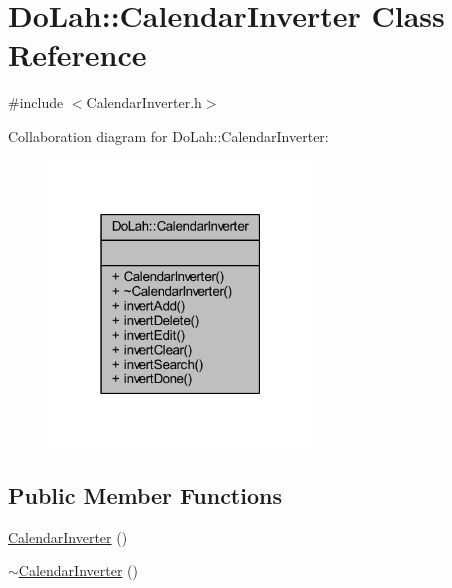 \hypertarget{class_do_lah_1_1_calendar_inverter}{}\section{Do\+Lah\+:\+:Calendar\+Inverter Class Reference}
\label{class_do_lah_1_1_calendar_inverter}


{\ttfamily \#include $<$Calendar\+Inverter.\+h$>$}



Collaboration diagram for Do\+Lah\+:\+:Calendar\+Inverter\+:\nopagebreak
\begin{figure}[H]
\begin{center}
\leavevmode
\includegraphics[width=199pt]{class_do_lah_1_1_calendar_inverter__coll__graph}
\end{center}
\end{figure}
\subsection*{Public Member Functions}
\begin{DoxyCompactItemize}
\item 
\hyperlink{class_do_lah_1_1_calendar_inverter_a51fb3dc56d04563676901b50f72c2dc6}{Calendar\+Inverter} ()
\item 
\hyperlink{class_do_lah_1_1_calendar_inverter_a29fc792ceaf73a246ad4fc700050c208}{$\sim$\+Calendar\+Inverter} ()
\end{DoxyCompactItemize}
